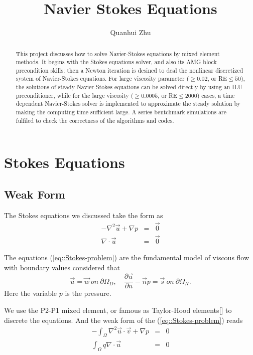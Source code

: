 \documentclass[a4paper]{article}
\title{Navier Stokes Equations}
\author{Quanhui Zhu}
\begin{document}
\maketitle

\begin{abstract}
This project discusses how to solve Navier-Stokes equations by mixed element methods. It begins with the Stokes equations solver, and also its AMG block precondition skills; then a Newton iteration is desined to deal the nonlinear discretized system of Navier-Stokes equations. For large viscosity parameter ($\geq 0.02$, or RE$\leq 50$), the solutions of steady Navier-Stokes equations can be solved directly by using an ILU preconditioner, while for the large viscosity ($\geq 0.0005$, or RE$\leq 2000$) cases, a time dependent Navier-Stokes solver is implemented to approximate the steady solution by making the computing time sufficient large. A series bentchmark simulations are fulfiled to check the correctness of the algorithms and codes.
\end{abstract}


\section{Stokes Equations}

\subsection{Weak Form}

The Stokes equations we discussed take the form as
\begin{equation}
\begin{array}{rcl}
-\nabla^2 \vec{u} + \nabla p &=& \vec{0} \\
\nabla \cdot \vec{u} &=& \vec{0}
\label{eq::Stokes-problem}
\end{array}
\end{equation}

The equations (\ref{eq::Stokes-problem}) are the fundamental model of viscous flow with boundary values considered that
\begin{equation}
\vec{u} = \vec{w} \ on \ \partial \Omega_D ,\quad \frac{\partial \vec{u}}{\partial n} - \vec{n} p = \vec{s} \ on \ \partial \Omega_N.
\end{equation}
Here the variable $p$ is the pressure.

We use the P2-P1 mixed element, or famous as Taylor-Hood elements[\cite{Lee2005Finite}] to discrete the equations. And the
weak form of the (\ref{eq::Stokes-problem}) reads 
\begin{equation}
\begin{array}{rcl}
-\int_\Omega \nabla^2 \vec{u} \cdot \vec{v} + \nabla p &=& 0\\
\int_\Omega q\nabla \cdot \vec{u} &=&0
\label{eq::Stokes-weakform}
\end{array}
\end{equation}
\end{document}

